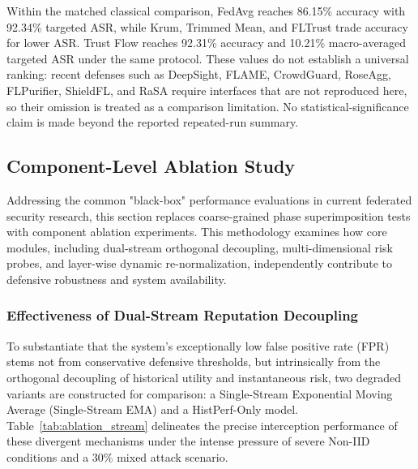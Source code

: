 \documentclass[11pt, a4paper]{article}
\begin{document}
Within the matched classical comparison, FedAvg reaches 86.15\% accuracy with 92.34\% targeted ASR, while Krum, Trimmed Mean, and FLTrust trade accuracy for lower ASR. Trust Flow reaches 92.31\% accuracy and 10.21\% macro-averaged targeted ASR under the same protocol. These values do not establish a universal ranking: recent defenses such as DeepSight, FLAME, CrowdGuard, RoseAgg, FLPurifier, ShieldFL, and RaSA require interfaces that are not reproduced here, so their omission is treated as a comparison limitation. No statistical-significance claim is made beyond the reported repeated-run summary.

\subsection{Component-Level Ablation Study}
Addressing the common "black-box" performance evaluations in current federated security research, this section replaces coarse-grained phase superimposition tests with component ablation experiments. This methodology examines how core modules, including dual-stream orthogonal decoupling, multi-dimensional risk probes, and layer-wise dynamic re-normalization, independently contribute to defensive robustness and system availability.

\subsubsection{Effectiveness of Dual-Stream Reputation Decoupling}
To substantiate that the system's exceptionally low false positive rate (FPR) stems not from conservative defensive thresholds, but intrinsically from the orthogonal decoupling of historical utility and instantaneous risk, two degraded variants are constructed for comparison: a Single-Stream Exponential Moving Average (Single-Stream EMA) and a HistPerf-Only model. Table~\ref{tab:ablation_stream} delineates the precise interception performance of these divergent mechanisms under the intense pressure of severe Non-IID conditions and a 30\% mixed attack scenario.
\end{document}
